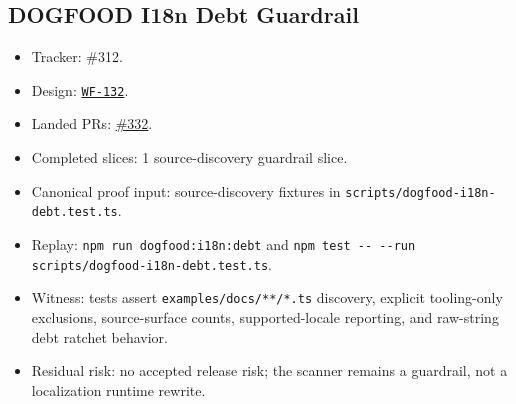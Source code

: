 \subsection{DOGFOOD I18n Debt Guardrail}\label{record-260-dogfood-i18n-debt-guardrail}

\begin{itemize}
\tightlist
\item
  Tracker: \#312.
\item
  Design: \href{https://github.com/flyingrobots/bijou/blob/cbd70612140e7a450d764b3c7be1c6af878b99bc/docs/design/WF-132-release-readiness-and-dogfood-i18n-gates.md}{\texttt{W\allowbreak{}F\allowbreak{}-\allowbreak{}1\allowbreak{}3\allowbreak{}2}}.
\item
  Landed PRs: \href{https://github.com/flyingrobots/bijou/pull/332}{\#332}.
\item
  Completed slices: 1 source-discovery guardrail slice.
\item
  Canonical proof input: source-discovery fixtures in \texttt{s\allowbreak{}c\allowbreak{}r\allowbreak{}i\allowbreak{}p\allowbreak{}t\allowbreak{}s\allowbreak{}/\allowbreak{}d\allowbreak{}o\allowbreak{}g\allowbreak{}f\allowbreak{}o\allowbreak{}o\allowbreak{}d\allowbreak{}-\allowbreak{}i\allowbreak{}1\allowbreak{}8\allowbreak{}n\allowbreak{}-\allowbreak{}d\allowbreak{}e\allowbreak{}b\allowbreak{}t\allowbreak{}.\allowbreak{}t\allowbreak{}e\allowbreak{}s\allowbreak{}t\allowbreak{}.\allowbreak{}t\allowbreak{}s}.
\item
  Replay: \texttt{n\allowbreak{}p\allowbreak{}m\allowbreak{} \allowbreak{}r\allowbreak{}u\allowbreak{}n\allowbreak{} \allowbreak{}d\allowbreak{}o\allowbreak{}g\allowbreak{}f\allowbreak{}o\allowbreak{}o\allowbreak{}d\allowbreak{}:\allowbreak{}i\allowbreak{}1\allowbreak{}8\allowbreak{}n\allowbreak{}:\allowbreak{}d\allowbreak{}e\allowbreak{}b\allowbreak{}t} and \texttt{n\allowbreak{}p\allowbreak{}m\allowbreak{} \allowbreak{}t\allowbreak{}e\allowbreak{}s\allowbreak{}t\allowbreak{} \allowbreak{}-\allowbreak{}-\allowbreak{} \allowbreak{}-\allowbreak{}-\allowbreak{}r\allowbreak{}u\allowbreak{}n\allowbreak{} \allowbreak{}s\allowbreak{}c\allowbreak{}r\allowbreak{}i\allowbreak{}p\allowbreak{}t\allowbreak{}s\allowbreak{}/\allowbreak{}d\allowbreak{}o\allowbreak{}g\allowbreak{}f\allowbreak{}o\allowbreak{}o\allowbreak{}d\allowbreak{}-\allowbreak{}i\allowbreak{}1\allowbreak{}8\allowbreak{}n\allowbreak{}-\allowbreak{}d\allowbreak{}e\allowbreak{}b\allowbreak{}t\allowbreak{}.\allowbreak{}t\allowbreak{}e\allowbreak{}s\allowbreak{}t\allowbreak{}.\allowbreak{}t\allowbreak{}s}.
\item
  Witness: tests assert \texttt{e\allowbreak{}x\allowbreak{}a\allowbreak{}m\allowbreak{}p\allowbreak{}l\allowbreak{}e\allowbreak{}s\allowbreak{}/\allowbreak{}d\allowbreak{}o\allowbreak{}c\allowbreak{}s\allowbreak{}/\allowbreak{}*\allowbreak{}*\allowbreak{}/\allowbreak{}*\allowbreak{}.\allowbreak{}t\allowbreak{}s} discovery, explicit tooling-only exclusions, source-surface counts, supported-locale reporting, and raw-string debt ratchet behavior.
\item
  Residual risk: no accepted release risk; the scanner remains a guardrail, not a localization runtime rewrite.
\end{itemize}

